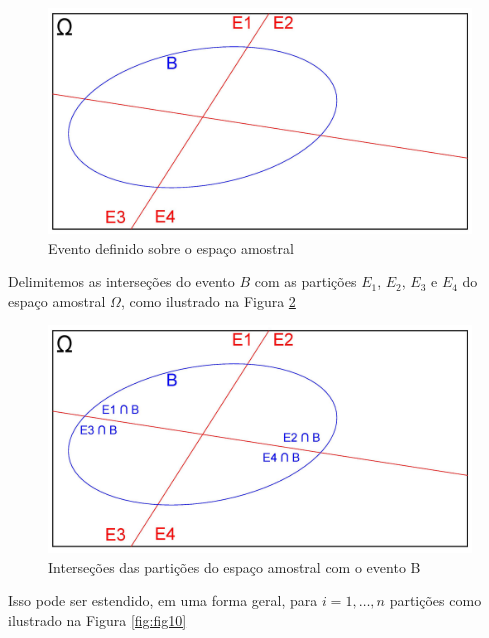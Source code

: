 \documentclass[
]{book}
\begin{document}
\begin{figure}

{\centering \includegraphics[width=0.8\linewidth]{images4/bayes_3} 

}

\caption{Evento definido sobre o espaço amostral}\label{fig:fig8}
\end{figure}

\hfill\break

Delimitemos as interseções do evento \(B\) com as partições \(E_{1}\), \(E_{2}\), \(E_{3}\) e \(E_{4}\) do espaço amostral \(\Omega\), como ilustrado na Figura \ref{fig:fig9}

\hfill\break

\begin{figure}

{\centering \includegraphics[width=0.8\linewidth]{images4/bayes_4} 

}

\caption{Interseções das partições do espaço amostral com o evento B}\label{fig:fig9}
\end{figure}

\hfill\break

Isso pode ser estendido, em uma forma geral, para \(i=1, \dots, n\) partições como ilustrado na Figura \ref{fig:fig10}

\hfill\break
\end{document}
